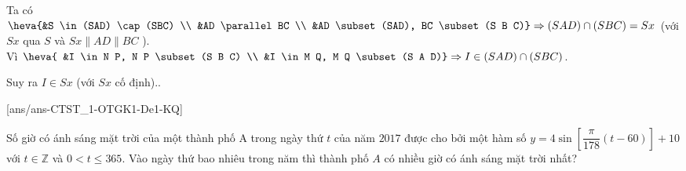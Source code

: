 \begin{ex}
{\begin{itemchoice}
			Ta có $\heva{&S \in(SAD) \cap(SBC) \\ &AD \parallel BC \\ &AD \subset(SAD), BC \subset(S B C)} \Rightarrow(S A D) \cap(S B C)=S x$
			(với $S x$ qua $S$ và $S x \parallel AD \parallel BC$ ).\\
			Vì $\heva{	&I \in N P, N P \subset(S B C) \\
				&I \in M Q, M Q \subset(S A D)}\Rightarrow I \in(S A D) \cap(S B C)$.
			
			Suy ra $I \in S x$ (với $S x$ cố định)..
		\end{itemchoice}
	}
\end{ex}
\caukq
{}[ans/ans-CTST_1-OTGK1-De1-KQ]
\begin{ex}%
	Số giờ có ánh sáng mặt trời của một thành phố A trong ngày thứ $t$ của năm $2017$ được cho bởi một hàm số $y=4\sin \left[\dfrac{\pi}{178}\left(t-60\right)\right]+10$ với $t\in \mathbb{Z}$ và $0<t\le 365$. Vào ngày thứ bao nhiêu trong năm thì thành phố $A$ có nhiều giờ có ánh sáng mặt trời nhất?
\end{ex}
